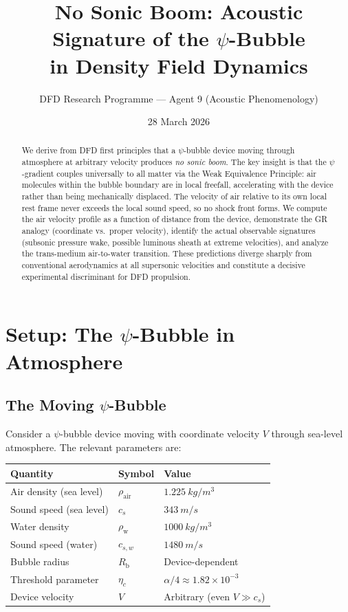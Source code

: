\documentclass[12pt, letterpaper]{article}
\title{No Sonic Boom: Acoustic Signature of the $\psi$-Bubble\\
in Density Field Dynamics}
\author{DFD Research Programme --- Agent 9 (Acoustic Phenomenology)}
\date{28 March 2026}
\theoremstyle{definition}
\theoremstyle{remark}
\newcommand{\etac}{\eta_c}
\newcommand{\Rbub}{R_{\mathrm{b}}}
\newcommand{\cs}{c_s}
\begin{document}
\maketitle

\begin{abstract}
We derive from DFD first principles that a $\psi$-bubble device moving through
atmosphere at arbitrary velocity produces \emph{no sonic boom}. The key insight
is that the $\psi$-gradient couples universally to all matter via the Weak
Equivalence Principle: air molecules within the bubble boundary are in local
freefall, accelerating with the device rather than being mechanically displaced.
The velocity of air relative to its own local rest frame never exceeds the
local sound speed, so no shock front forms. We compute the air velocity profile
as a function of distance from the device, demonstrate the GR analogy
(coordinate vs.\ proper velocity), identify the actual observable signatures
(subsonic pressure wake, possible luminous sheath at extreme velocities), and
analyze the trans-medium air-to-water transition. These predictions diverge
sharply from conventional aerodynamics at all supersonic velocities and
constitute a decisive experimental discriminant for DFD propulsion.
\end{abstract}

\tableofcontents

\section{Setup: The $\psi$-Bubble in Atmosphere}
\label{sec:setup}

\subsection{The Moving $\psi$-Bubble}

Consider a $\psi$-bubble device moving with coordinate velocity $V$ through
sea-level atmosphere. The relevant parameters are:

\begin{center}
\begin{tabular}{lll}
\toprule
\textbf{Quantity} & \textbf{Symbol} & \textbf{Value} \\
\midrule
Air density (sea level) & $\rho_{\mathrm{air}}$ & $\SI{1.225}{kg/m^3}$ \\
Sound speed (sea level) & $\cs$ & $\SI{343}{m/s}$ \\
Water density & $\rho_{\mathrm{w}}$ & $\SI{1000}{kg/m^3}$ \\
Sound speed (water) & $c_{s,w}$ & $\SI{1480}{m/s}$ \\
Bubble radius & $\Rbub$ & Device-dependent \\
Threshold parameter & $\etac$ & $\alpha/4 \approx 1.82 \times 10^{-3}$ \\
Device velocity & $V$ & Arbitrary (even $V \gg \cs$) \\
\bottomrule
\end{tabular}
\end{center}
\end{document}
